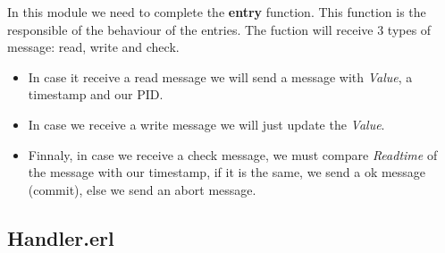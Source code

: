 \documentclass[a4paper, 10pt]{article}
\begin{document}
In this module we need to complete the \textbf{entry} function. This function is the responsible of the behaviour of the entries. The fuction will receive 3 types of message: read, write and check. 

\begin{itemize}
  \item  In case it receive a read message we will send a message with \textit{Value}, a timestamp and our PID.
  \item In case we receive a write message we will just update the \textit{Value}. 
  \item Finnaly, in case we receive a check message, we must compare \textit{Readtime} of the message with our timestamp, if it is the same, we send a ok message (commit), else we send an abort message.
\end{itemize}


\subsection{Handler.erl}
\end{document}
